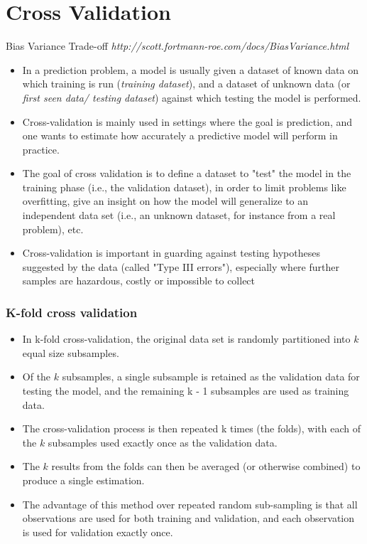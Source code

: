 \documentclass[caret-main.tex]{subfiles}
\begin{document}
\section{Cross Validation}
Bias Variance Trade-off \textit{http://scott.fortmann-roe.com/docs/BiasVariance.html}
\begin{itemize}
\item In a prediction problem, a model is usually given a dataset of known data 
on which training is run (\textit{training dataset}), and a dataset of unknown data (or \textit{first seen data/ testing dataset}) against which testing the model is performed.
\item Cross-validation is mainly used in settings where the goal is prediction, and one wants to estimate how accurately a predictive model will perform in practice. 
\item The goal of cross validation is to define a dataset to "test" the model in the training phase (i.e., the validation dataset), in order to limit problems like overfitting, give an insight on how the model will generalize to an independent data set (i.e., an unknown dataset, for instance from a real problem), etc.
\item Cross-validation is important in guarding against testing hypotheses suggested by the data (called "Type III errors"), especially where further samples 
are hazardous, costly or impossible to collect 
\end{itemize}
\newpage
\subsubsection{K-fold cross validation}
\begin{itemize}
\item In k-fold cross-validation, the original data set is randomly partitioned into $k$ equal size subsamples. 
\item Of the $k$ subsamples, a single subsample is retained as the validation data for testing the model, and the remaining k - 1 subsamples are used as training data. 
\item The cross-validation process is then repeated k times (the folds), with each of the $k$ subsamples used exactly once as the validation data. \item The $k$ results from the folds can then be averaged (or otherwise combined) to produce a single estimation.
\item The advantage of this method over repeated random sub-sampling is that all observations are used for both training and validation, and each observation is used for validation exactly once. 
\end{itemize}
\end{document}
